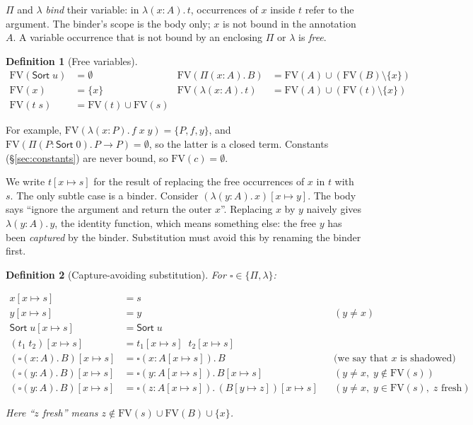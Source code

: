 \documentclass[acmsmall,screen,nonacm]{acmart}
\newtheorem{definition}{Definition}
\newcommand{\Sort}[1]{\mathsf{Sort}\;#1}
\newcommand{\tPi}[3]{\Pi(#1{:}#2).\,#3}
\newcommand{\tLam}[3]{\lambda(#1{:}#2).\,#3}
\newcommand{\subst}[3]{#1[#2 \mapsto #3]}
\newcommand{\FV}{\mathrm{FV}}
\begin{document}
$\Pi$ and $\lambda$ \emph{bind} their variable: in $\tLam{x}{A}{t}$, occurrences of $x$
inside $t$ refer to the argument. The binder's scope is the body only; $x$ is not bound
in the annotation $A$.
A variable occurrence that is not bound by an enclosing $\Pi$ or $\lambda$ is \emph{free}.

\begin{definition}[Free variables]
\begin{align*}
\FV(\Sort{u}) &= \emptyset &
\FV(\tPi{x}{A}{B}) &= \FV(A) \cup (\FV(B) \setminus \{x\}) \\
\FV(x) &= \{x\} &
\FV(\tLam{x}{A}{t}) &= \FV(A) \cup (\FV(t) \setminus \{x\}) \\
\FV(t\;s) &= \FV(t) \cup \FV(s)
\end{align*}
\end{definition}

\noindent For example, $\FV(\tLam{x}{P}{f\;x\;y}) = \{P, f, y\}$, and $\FV(\tPi{P}{\Sort{0}}{P \to P}) = \emptyset$, so the latter is a closed term.
Constants (\S\ref{sec:constants}) are never bound, so $\FV(c) = \emptyset$.

We write $\subst{t}{x}{s}$ for the result of replacing the free occurrences
of $x$ in $t$ with $s$.
The only subtle case is a binder. Consider $\subst{(\tLam{y}{A}{x})}{x}{y}$. The body
says ``ignore the argument and return the outer $x$''. Replacing $x$ by $y$
naively gives $\tLam{y}{A}{y}$, the identity function, which means something else:
the free $y$ has been \emph{captured} by the binder. Substitution must avoid this
by renaming the binder first.

\begin{definition}[Capture-avoiding substitution]

For $\square \in \{\Pi, \lambda\}$:

\begin{align*}
\subst{x}{x}{s} &= s \\
\subst{y}{x}{s} &= y && (y \neq x) \\
\subst{\Sort{u}}{x}{s} &= \Sort{u} \\
\subst{(t_1\;t_2)}{x}{s} &= \subst{t_1}{x}{s}\;\;\subst{t_2}{x}{s} \\
\subst{(\square(x{:}A).\,B)}{x}{s} &= \square(x{:}\subst{A}{x}{s}).\,B
  && \text{(we say that $x$ is shadowed)} \\
\subst{(\square(y{:}A).\,B)}{x}{s} &= \square(y{:}\subst{A}{x}{s}).\,\subst{B}{x}{s}
  && (y \neq x,\; y \notin \FV(s)) \\
\subst{(\square(y{:}A).\,B)}{x}{s} &= \square(z{:}\subst{A}{x}{s}).\,\subst{(\subst{B}{y}{z})}{x}{s}
  && (y \neq x,\; y \in \FV(s),\; z \text{ fresh})
\end{align*}

\noindent Here ``$z$ fresh'' means $z \notin \FV(s) \cup \FV(B) \cup \{x\}$.

\end{definition}
\end{document}
